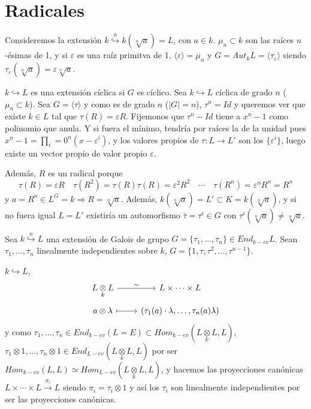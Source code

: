 \section{Radicales}
\begin{ejem}
    Consideremos la extensi\'on $k \overset{n}{\hookrightarrow} k(\sqrt[n]{a}) = L$, con $a\in k$. $\mu_n\subset k$ son las ra\'ices $n$-\'esimas de 1, y si $\varepsilon$ es una ra\'iz primitva de 1, $\langle \varepsilon \rangle  = \mu_n$ y $G = Aut_kL=\langle \tau_{\varepsilon} \rangle$ siendo $\tau_{\varepsilon} (\sqrt[n]{a}) = \varepsilon \sqrt[n]{a}$.
    
    $k \hookrightarrow L$ es una extensi\'on c\'iclica si $G$ es c\'iclico. Sea $k \hookrightarrow L$ c\'iclica de grado $n$ ($\mu_n\subset k$). Sea $G=\langle \tau\rangle$ y como es de grado $n$ ($|G|=n$), $\tau^n = Id$ y queremos ver que existe $k \in L$ tal que $\tau(R)=\varepsilon R$. Fijemonos que $\tau^n-Id$ tiene a $x^n-1$ como polinomio que anula. Y si fuera el m\'inimo, tendr\'ia por ra\'ices la de la unidad pues $x^n-1 = \prod_i=0^n(x-\varepsilon^i)$, y los valores propios de $\tau:L \to L'$ son los $\{\varepsilon^i\}$, luego existe un vector propio de valor propio $\varepsilon$.  

    Adem\'as, $R$ es un radical porque 
    $$\tau(R) = \varepsilon R \quad \tau (R^2) = \tau (R) \tau (R) = \varepsilon^2 R^2 \quad  \cdots \quad \tau (R^n) = \varepsilon^n R^n = R^n$$
    y $a=R^n \in L^G = k \Rightarrow R = \sqrt[n]{a}$. Adem\'as, $k(\sqrt[n]{a})=L' \subset K = k(\sqrt[n]{a})$, y si no fuera igual $L=L'$ existir\'ia un automorfismo $\bar \tau = \tau^i \in G$ con $\tau^i (\sqrt[n]{a}) \neq \sqrt[n]{a}$. 
\end{ejem}
\begin{teo}
     Sea $k \overset{n}{\hookrightarrow} L$ una extensi\'on de Galois de grupo $G = \{\tau_1, \ldots, \tau_n\} \in End_{k-ev} L$. Sean $\tau_1, \ldots, \tau_n$ linealmente independientes sobre $k$, $G = \{1, \tau, \tau^2, \ldots, \tau^{n-1}\}$.
\end{teo}\begin{dem}$k \hookrightarrow L$, 
$$ \bt L\underset{k}{\otimes} L \rar{\sim} &  L \times \cdots \times L  \\[-5mm] a\otimes \lambda \rarmaps & (\tau_1(a)\cdot \lambda, \ldots, \tau_n(a)\lambda) \et$$
y como $\tau_1, \ldots, \tau_n \in End_{k-ev}(L = E) \subset Hom_{k-ev}(L\underset{k}{\otimes} L, L)$, $\tau_1 \otimes 1, \ldots, \tau_n\otimes 1\in End_{L-ev}(L\underset{k}{\otimes} L, L )$ por ser $Hom_{k-ev}(L,L)\simeq Hom_{L-ev}(L\underset{k}{\otimes} L ,L)$, y hacemos las proyecciones can\'onicas $L\times \cdots \times L \overset{\pi_i}{\longrightarrow} L$ siendo $\pi_i = \tau_i \otimes 1$ y as\'i los $\tau_i$ son linealmente independientes por ser las proyecciones can\'onicas. 
\end{dem}
